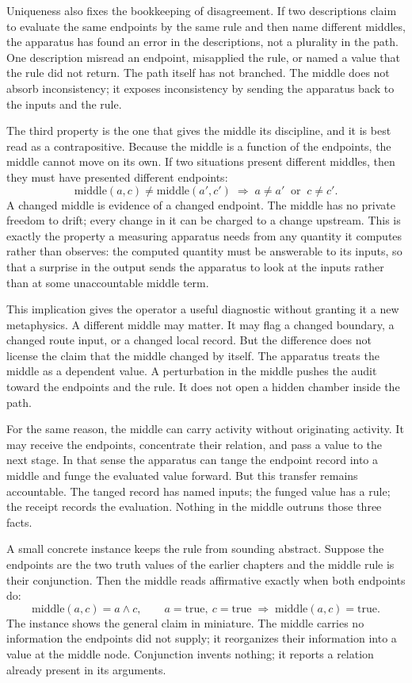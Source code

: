 Uniqueness also fixes the bookkeeping of disagreement. If two descriptions claim
to evaluate the same endpoints by the same rule and then name different middles,
the apparatus has found an error in the descriptions, not a plurality in the
path. One description misread an endpoint, misapplied the rule, or named a value
that the rule did not return. The path itself has not branched. The middle does
not absorb inconsistency; it exposes inconsistency by sending the apparatus back
to the inputs and the rule.

The third property is the one that gives the middle its discipline, and it is best
read as a contrapositive. Because the middle is a function of the endpoints, the
middle cannot move on its own. If two situations present different middles, then
they must have presented different endpoints:
\[
  \mathrm{middle}(a,c) \neq \mathrm{middle}(a',c')
  \;\Longrightarrow\;
  a \neq a' \ \text{ or }\ c \neq c'.
\]
A changed middle is evidence of a changed endpoint. The middle has no private
freedom to drift; every change in it can be charged to a change upstream. This is
exactly the property a measuring apparatus needs from any quantity it computes
rather than observes: the computed quantity must be answerable to its inputs, so
that a surprise in the output sends the apparatus to look at the inputs rather
than at some unaccountable middle term.

This implication gives the operator a useful diagnostic without granting it a
new metaphysics. A different middle may matter. It may flag a changed boundary,
a changed route input, or a changed local record. But the difference does not
license the claim that the middle changed by itself. The apparatus treats the
middle as a dependent value. A perturbation in the middle pushes the audit toward
the endpoints and the rule. It does not open a hidden chamber inside the path.

For the same reason, the middle can carry activity without originating activity.
It may receive the endpoints, concentrate their relation, and pass a value to the
next stage. In that sense the apparatus can tange the endpoint record into a
middle and funge the evaluated value forward. But this transfer remains
accountable. The tanged record has named inputs; the funged value has a rule; the
receipt records the evaluation. Nothing in the middle outruns those three facts.

A small concrete instance keeps the rule from sounding abstract. Suppose the
endpoints are the two truth values of the earlier chapters and the middle rule is
their conjunction. Then the middle reads affirmative exactly when both endpoints
do:
\[
  \mathrm{middle}(a,c) = a \wedge c,
  \qquad
  a = \text{true},\ c = \text{true}
  \;\Longrightarrow\;
  \mathrm{middle}(a,c) = \text{true}.
\]
The instance shows the general claim in miniature. The middle carries no
information the endpoints did not supply; it reorganizes their information into a
value at the middle node. Conjunction invents nothing; it reports a relation
already present in its arguments.

